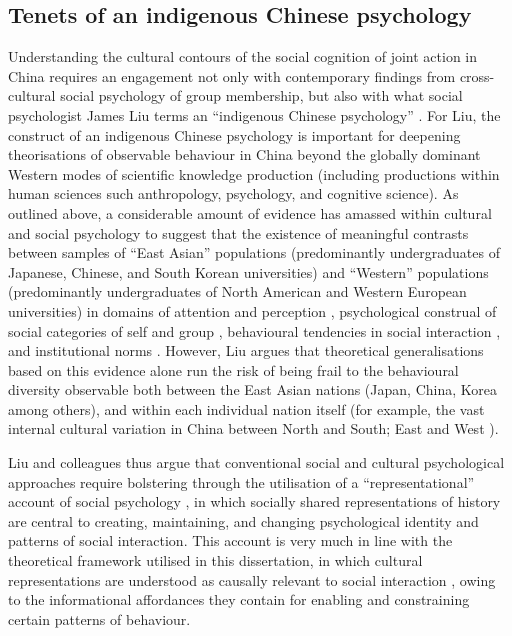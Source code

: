 \begin{CJK}{UTF8}{gbsn}
\subsection{Tenets of an indigenous Chinese psychology\label{sect:indigPsych}}
Understanding the cultural contours of the social cognition of joint action in China requires an engagement not only with contemporary findings from cross-cultural social psychology of group membership, but also with what social psychologist James Liu terms an ``indigenous Chinese psychology'' \citep{Liu2009}.  For Liu, the construct of an indigenous Chinese psychology is important for deepening theorisations of observable behaviour in China beyond the globally dominant Western modes of scientific knowledge production (including productions within human sciences such anthropology, psychology, and cognitive science).  As outlined above, a considerable amount of evidence has amassed within cultural and social psychology to suggest that the existence of meaningful contrasts between samples of ``East Asian'' populations (predominantly undergraduates of Japanese, Chinese, and South Korean universities) and ``Western'' populations (predominantly undergraduates of North American and Western European universities) in domains of attention and perception \citep{Peng1997,Nisbett2003}, psychological construal of social categories of self and group \citep{Markus1991}, behavioural tendencies in social interaction \citep{Yuki2003}, and institutional norms \citep{Liu2017}.  However, Liu argues that theoretical generalisations based on this evidence alone run the risk of being frail to the behavioural diversity observable both between the East Asian nations (Japan, China, Korea among others), and within each individual nation itself (for example, the vast internal cultural variation in China between North and South; East and West \citep[see, for example,][]{Henrich2014}).

Liu and colleagues thus argue that conventional social and cultural psychological approaches require bolstering through the utilisation of a ``representational'' account of social psychology \citep{Liu2005}, in which socially shared representations of history are central to creating, maintaining, and changing psychological identity and patterns of social interaction.  This account is very much in line with the theoretical framework utilised in this dissertation, in which cultural representations are understood as causally relevant to social interaction \citep{Vesper2017}, owing to the informational affordances they contain for enabling and constraining certain patterns of behaviour.


\end{CJK}
